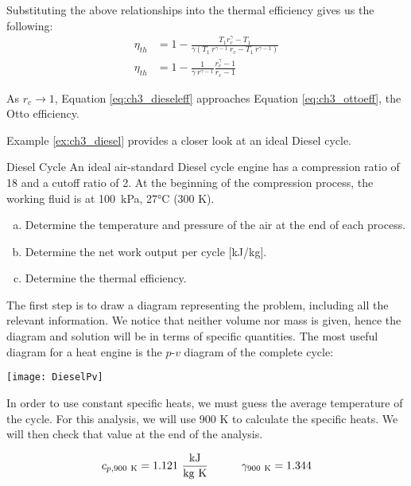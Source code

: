 Substituting the above relationships into the thermal efficiency gives us the following:
\begin{align}
  \nonumber \eta_{th} &= 1 - \frac{T_1 r_c^{\gamma} - T_1}{\gamma \left(T_1 \: r^{\gamma-1}\: r_c -  T_1\: r^{\gamma-1}\right)} \\
  \label{eq:ch3_dieseleff} \eta_{th} &= 1 - \frac{1}{\gamma\:r^{\gamma-1}}\frac{r_c^{\gamma} - 1}{r_c -  1}
\end{align}

As $r_c\rightarrow 1$, Equation \ref{eq:ch3_dieseleff} approaches Equation \ref{eq:ch3_ottoeff}, the Otto efficiency.

Example \ref{ex:ch3_diesel} provides a closer look at an ideal Diesel cycle.

\begin{example}[label=ex:ch3_diesel]{Diesel Cycle}
  An ideal air-standard Diesel cycle engine has a compression ratio of 18 and a cutoff ratio of 2. At the beginning of the compression process, the working fluid is at \mbox{100 kPa}, 27°C (300 K).
\begin{enumerate}[a)]
\item Determine the temperature and pressure of the air at the end of each process.
\item Determine the net work output per cycle [kJ/kg].
\item Determine the thermal efficiency.
\end{enumerate}

The first step is to draw a diagram representing the problem, including all the relevant information. We notice that neither volume nor mass is given, hence the diagram and solution will be in terms of specific quantities. The most useful diagram for a heat engine is the $p$-$v$ diagram of the complete cycle:

\begin{center}
\texttt{[image: DieselPv]}
\end{center}

In order to use constant specific heats, we must guess the average temperature of the cycle.  For this analysis, we will use 900 K to calculate the specific heats.  We will then check that value at the end of the analysis.

\begin{equation*}
  c_{p,900\rm\ K} = 1.121\ \frac{\rm kJ}{\rm kg\ K} \quad\quad\quad \gamma_{900\rm\ K} = 1.344
\end{equation*}


\end{example}
